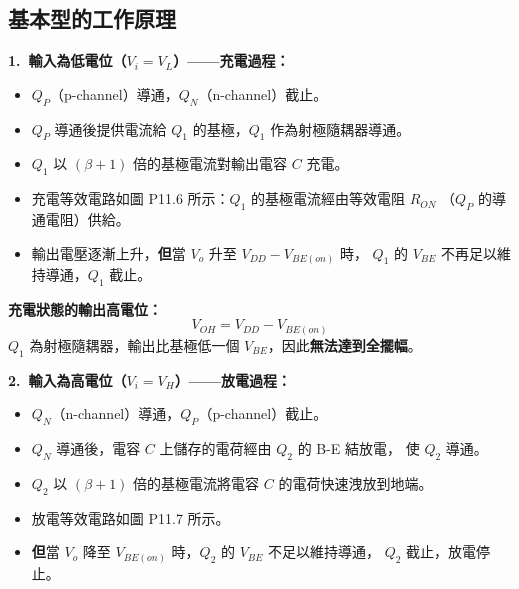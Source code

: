 \documentclass[12pt]{article}
\begin{document}
\subsection*{基本型的工作原理}

\textbf{1.\ 輸入為低電位（$V_i = V_L$）——充電過程：}

\begin{minipage}{0.58\linewidth}
\begin{itemize}[leftmargin=1.8em,itemsep=2pt]
\item $Q_P$（p-channel）導通，$Q_N$（n-channel）截止。
\item $Q_P$ 導通後提供電流給 $Q_1$ 的基極，$Q_1$ 作為射極隨耦器導通。
\item $Q_1$ 以 $(\beta+1)$ 倍的基極電流對輸出電容 $C$ 充電。
\item 充電等效電路如圖 P11.6 所示：$Q_1$ 的基極電流經由等效電阻 $R_{ON}$
  （$Q_P$ 的導通電阻）供給。
\item 輸出電壓逐漸上升，\textbf{但}當 $V_o$ 升至 $V_{DD} - V_{BE(on)}$ 時，
  $Q_1$ 的 $V_{BE}$ 不再足以維持導通，$Q_1$ 截止。
\end{itemize}
\end{minipage}\hfill
\begin{minipage}{0.39\linewidth}
\end{minipage}

\begin{formulabox}
\textbf{充電狀態的輸出高電位：}
\[
V_{OH} = V_{DD} - V_{BE(on)}
\]
$Q_1$ 為射極隨耦器，輸出比基極低一個 $V_{BE}$，因此\textbf{無法達到全擺幅}。
\end{formulabox}

\bigskip
\textbf{2.\ 輸入為高電位（$V_i = V_H$）——放電過程：}

\begin{minipage}{0.58\linewidth}
\begin{itemize}[leftmargin=1.8em,itemsep=2pt]
\item $Q_N$（n-channel）導通，$Q_P$（p-channel）截止。
\item $Q_N$ 導通後，電容 $C$ 上儲存的電荷經由 $Q_2$ 的 B-E 結放電，
  使 $Q_2$ 導通。
\item $Q_2$ 以 $(\beta+1)$ 倍的基極電流將電容 $C$ 的電荷快速洩放到地端。
\item 放電等效電路如圖 P11.7 所示。
\item \textbf{但}當 $V_o$ 降至 $V_{BE(on)}$ 時，$Q_2$ 的 $V_{BE}$ 不足以維持導通，
  $Q_2$ 截止，放電停止。
\end{itemize}
\end{minipage}\hfill
\begin{minipage}{0.39\linewidth}
\end{minipage}
\end{document}
